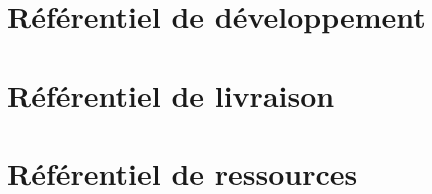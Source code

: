   \section{Référentiel de développement}
 
 
  \section{Référentiel de livraison}
 
 
  \section{Référentiel de ressources}
 
